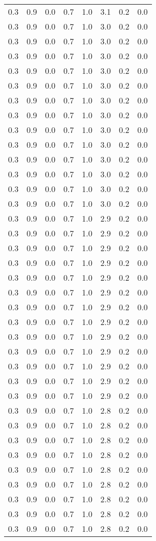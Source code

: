 \begin{tabular}{L{1in}|L{1in}|L{1in}|L{1in}|L{1in}|L{1in}|L{1in}|L{1in}}
0.3&0.9&0.0&0.7&1.0&3.1&0.2&0.0\\
0.3&0.9&0.0&0.7&1.0&3.0&0.2&0.0\\
0.3&0.9&0.0&0.7&1.0&3.0&0.2&0.0\\
0.3&0.9&0.0&0.7&1.0&3.0&0.2&0.0\\
0.3&0.9&0.0&0.7&1.0&3.0&0.2&0.0\\
0.3&0.9&0.0&0.7&1.0&3.0&0.2&0.0\\
0.3&0.9&0.0&0.7&1.0&3.0&0.2&0.0\\
0.3&0.9&0.0&0.7&1.0&3.0&0.2&0.0\\
0.3&0.9&0.0&0.7&1.0&3.0&0.2&0.0\\
0.3&0.9&0.0&0.7&1.0&3.0&0.2&0.0\\
0.3&0.9&0.0&0.7&1.0&3.0&0.2&0.0\\
0.3&0.9&0.0&0.7&1.0&3.0&0.2&0.0\\
0.3&0.9&0.0&0.7&1.0&3.0&0.2&0.0\\
0.3&0.9&0.0&0.7&1.0&3.0&0.2&0.0\\
0.3&0.9&0.0&0.7&1.0&2.9&0.2&0.0\\
0.3&0.9&0.0&0.7&1.0&2.9&0.2&0.0\\
0.3&0.9&0.0&0.7&1.0&2.9&0.2&0.0\\
0.3&0.9&0.0&0.7&1.0&2.9&0.2&0.0\\
0.3&0.9&0.0&0.7&1.0&2.9&0.2&0.0\\
0.3&0.9&0.0&0.7&1.0&2.9&0.2&0.0\\
0.3&0.9&0.0&0.7&1.0&2.9&0.2&0.0\\
0.3&0.9&0.0&0.7&1.0&2.9&0.2&0.0\\
0.3&0.9&0.0&0.7&1.0&2.9&0.2&0.0\\
0.3&0.9&0.0&0.7&1.0&2.9&0.2&0.0\\
0.3&0.9&0.0&0.7&1.0&2.9&0.2&0.0\\
0.3&0.9&0.0&0.7&1.0&2.9&0.2&0.0\\
0.3&0.9&0.0&0.7&1.0&2.9&0.2&0.0\\
0.3&0.9&0.0&0.7&1.0&2.8&0.2&0.0\\
0.3&0.9&0.0&0.7&1.0&2.8&0.2&0.0\\
0.3&0.9&0.0&0.7&1.0&2.8&0.2&0.0\\
0.3&0.9&0.0&0.7&1.0&2.8&0.2&0.0\\
0.3&0.9&0.0&0.7&1.0&2.8&0.2&0.0\\
0.3&0.9&0.0&0.7&1.0&2.8&0.2&0.0\\
0.3&0.9&0.0&0.7&1.0&2.8&0.2&0.0\\
0.3&0.9&0.0&0.7&1.0&2.8&0.2&0.0\\
0.3&0.9&0.0&0.7&1.0&2.8&0.2&0.0\\

\end{tabular}
